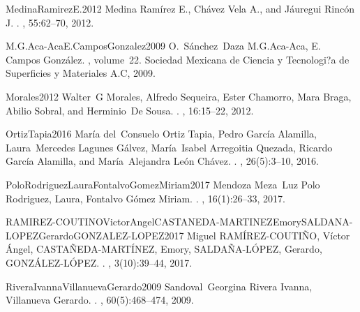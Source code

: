 \begin{description}
\item{MedinaRamirezE.2012}
{Medina Ram{\'{i}}rez E.}, {Ch{\'{a}}vez Vela A.}, and {J{\'{a}}uregui
	Rinc{\'{o}}n J.}
.
, 55:62--70, 2012.

\item{M.G.Aca-AcaE.CamposGonzalez2009}
O.~S{\'{a}}nchez~Daza {M.G.Aca-Aca, E. Campos Gonz{\'{a}}lez}.
, volume~22.
\newblock Sociedad Mexicana de Ciencia y Tecnologi?a de Superficies y
Materiales A.C, 2009.

\item{Morales2012}
Walter~G Morales, Alfredo Sequeira, Ester Chamorro, Mara Braga, Abilio Sobral,
and Herminio~De Sousa.
.
, 16:15--22, 2012.

\item{OrtizTapia2016}
Mar{\'{i}}a del~Consuelo {Ortiz Tapia}, Pedro {Garc{\'{i}}a Alamilla},
Laura~Mercedes {Lagunes G{\'{a}}lvez}, Mar{\'{i}}a~Isabel {Arregoitia
	Quezada}, Ricardo {Garc{\'{i}}a Alamilla}, and Mar{\'{i}}a~Alejandra
{Le{\'{o}}n Ch{\'{a}}vez}.
.
, 26(5):3--10, 2016.

\item{PoloRodriguezLauraFontalvoGomezMiriam2017}
Mendoza Meza~Luz {Polo Rodriguez, Laura, Fontalvo G{\'{o}}mez Miriam}.
.
, 16(1):26--33, 2017.

\item{RAMIREZ-COUTINOVictorAngelCASTANEDA-MARTINEZEmorySALDANA-LOPEZGerardoGONZALEZ-LOPEZ2017}
Miguel {RAM{\'{I}}REZ-COUTI{\~{N}}O, V{\'{i}}ctor {\'{A}}ngel,
	CASTA{\~{N}}EDA-MART{\'{I}}NEZ, Emory, SALDA{\~{N}}A-L{\'{O}}PEZ, Gerardo,
	GONZ{\'{A}}LEZ-L{\'{O}}PEZ}.
.
, 3(10):39--44, 2017.

\item{RiveraIvannaVillanuevaGerardo2009}
Sandoval~Georgina {Rivera Ivanna, Villanueva Gerardo}.
.
, 60(5):468--474, 2009.


\end{description}
